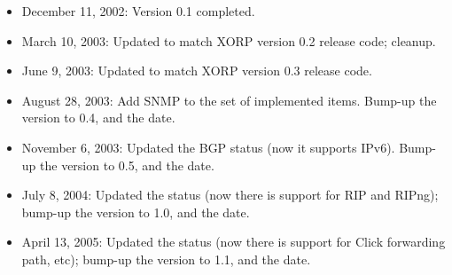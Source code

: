 \documentclass[11pt]{article}
\begin{document}
\begin{itemize}

  \item December 11, 2002: Version 0.1 completed.

  \item March 10, 2003: Updated to match XORP version 0.2 release code;
  cleanup.

  \item June 9, 2003: Updated to match XORP version 0.3 release code.

  \item August 28, 2003: Add SNMP to the set of implemented items. Bump-up the
  version to 0.4, and the date.

  \item November 6, 2003: Updated the BGP status (now it supports
  IPv6). Bump-up the version to 0.5, and the date.

  \item July 8, 2004: Updated the status (now there is support for RIP and
  RIPng); bump-up the version to 1.0, and the date.

  \item April 13, 2005: Updated the status (now there is support for
  Click forwarding path, etc); bump-up the version to 1.1, and the date.

\end{itemize}





\end{document}
